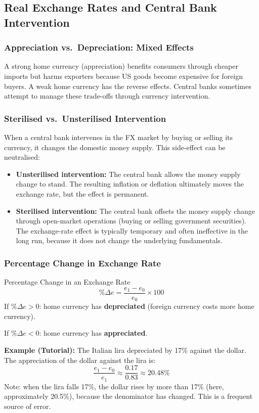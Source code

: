 \documentclass[11pt,a4paper]{article}
\begin{document}
\subsection{Real Exchange Rates and Central Bank Intervention}

\subsubsection{Appreciation vs.\ Depreciation: Mixed Effects}

A strong home currency (appreciation) benefits consumers through cheaper imports but harms exporters because US goods become expensive for foreign buyers. A weak home currency has the reverse effects. Central banks sometimes attempt to manage these trade-offs through currency intervention.

\subsubsection{Sterilised vs.\ Unsterilised Intervention}

When a central bank intervenes in the FX market by buying or selling its currency, it changes the domestic money supply. This side-effect can be neutralised:

\begin{itemize}
  \item \textbf{Unsterilised intervention:} The central bank allows the money supply change to stand. The resulting inflation or deflation ultimately moves the exchange rate, but the effect is permanent.
  \item \textbf{Sterilised intervention:} The central bank offsets the money supply change through open-market operations (buying or selling government securities). The exchange-rate effect is typically temporary and often ineffective in the long run, because it does not change the underlying fundamentals.
\end{itemize}

\subsubsection{Percentage Change in Exchange Rate}

\begin{formulabox}{Percentage Change in an Exchange Rate}
\[
  \%\Delta e = \frac{e_1 - e_0}{e_0} \times 100
\]
If $\%\Delta e > 0$: home currency has \textbf{depreciated} (foreign currency costs more home currency).

If $\%\Delta e < 0$: home currency has \textbf{appreciated}.

\textbf{Example (Tutorial):} The Italian lira depreciated by 17\% against the dollar. The appreciation of the dollar against the lira is:
\[
  \frac{e_1 - e_0}{e_1} \approx \frac{0.17}{0.83} \approx 20.48\%
\]
Note: when the lira falls 17\%, the dollar rises by more than 17\% (here, approximately 20.5\%), because the denominator has changed. This is a frequent source of error.
\end{formulabox}
\end{document}
